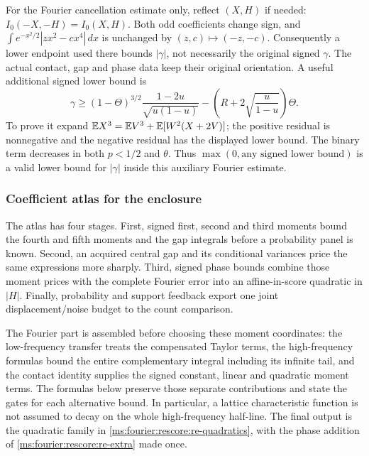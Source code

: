 For the Fourier cancellation estimate only, reflect $(X,H)$ if needed:
$I_0(-X,-H)=I_0(X,H)$. Both odd coefficients change sign, and
$\int e^{-x^2/2}|zx^2-cx^4|\,dx$ is unchanged by $(z,c)\mapsto(-z,-c)$.
Consequently a lower endpoint used there bounds $|\gamma|$, not necessarily
the original signed $\gamma$. The actual contact, gap and phase data keep
their original orientation. A useful additional signed lower bound is
\begin{equation}\label{ms:fourier:rescore:re-gamma}
 \gamma\ge(1-\Theta)^{3/2}\frac{1-2u}{\sqrt{u(1-u)}}
       -\left(R+2\sqrt{\frac{u}{1-u}}\right)\Theta.
\end{equation}
To prove it expand $\mathbb E X^3=\mathbb E V^3+\mathbb E[W^2(X+2V)]$; the positive
residual is nonnegative and the negative residual has the displayed
lower bound. The binary term decreases in both $p<1/2$ and $\theta$.
Thus $\max(0,\text{any signed lower bound})$ is a valid lower bound for
$|\gamma|$ inside this auxiliary Fourier estimate.

\subsubsection{Coefficient atlas for the enclosure}\label{ms:fourier:rescore:re-atlas}

The atlas has four stages. First, signed first, second and third moments
bound the fourth and fifth moments and the gap integrals before a
probability panel is known. Second, an acquired central gap and its
conditional variances price the same expressions more sharply.
Third, signed phase bounds combine those moment prices with the complete
Fourier error into an affine-in-score quadratic in $|H|$. Finally,
probability and support feedback export one joint displacement/noise
budget to the count comparison.

The Fourier part is assembled before choosing these moment coordinates:
the low-frequency transfer treats the compensated Taylor terms, the
high-frequency formulas bound the entire complementary integral including
its infinite tail, and the contact identity supplies the signed
constant, linear and quadratic moment terms. The formulas below preserve
those separate contributions and state the gates for each alternative
bound. In particular, a lattice characteristic function is not assumed
to decay on the whole high-frequency half-line. The final output is the
quadratic family in \eqref{ms:fourier:rescore:re-quadratics}, with the
phase addition of \eqref{ms:fourier:rescore:re-extra} made once.

